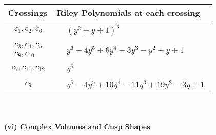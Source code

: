 \documentclass[1p]{elsarticle_modified}
\theoremstyle{definition}
\begin{document}
\begin{tabular}{m{50pt}|m{274pt}}
Crossings & \hspace{64pt}Riley Polynomials at each crossing \\
\hline $$\begin{aligned}c_{1},c_{2},c_{6}\end{aligned}$$&$\begin{aligned}
&(y^2+y+1)^3
\end{aligned}$\\
\hline $$\begin{aligned}c_{3},c_{4},c_{5}\\c_{8},c_{10}\end{aligned}$$&$\begin{aligned}
&y^6-4 y^5+6 y^4-3 y^3- y^2+y+1
\end{aligned}$\\
\hline $$\begin{aligned}c_{7},c_{11},c_{12}\end{aligned}$$&$\begin{aligned}
&y^6
\end{aligned}$\\
\hline $$\begin{aligned}c_{9}\end{aligned}$$&$\begin{aligned}
&y^6-4 y^5+10 y^4-11 y^3+19 y^2-3 y+1
\end{aligned}$\\
\hline
\end{tabular}\\~\\
\newpage\flushleft \textbf{(vi) Complex Volumes and Cusp Shapes}
\end{document}
